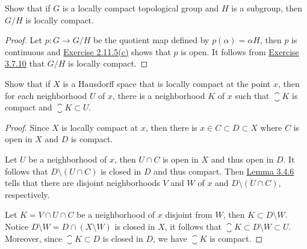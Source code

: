 \documentclass[12pt,a4paper]{article}
\begin{document}
    \begin{ex}
        Show that if $G$ is a locally compact topological group and $H$ is a subgroup, then $G/H$ is locally compact.
    \end{ex}
    \begin{proof}
        Let $p:G\to G/H$ be the quotient map defined by $p(\alpha)=\alpha H$, then $p$ is continuous and \hyperref[2.11.5]{Exercise 2.11.5(c)} shows that $p$ is open. It follows from \hyperref[3.7.10]{Exercise 3.7.10} that $G/H$ is locally compact.
    \end{proof}
    \hfill

    \begin{ex}
        Show that if $X$ is a Hausdorff space that is locally compact at the point $x$, then for each neighborhood $U$ of $x$, there is a neighborhood $K$ of $x$ such that $\closure{K}$ is compact and $\closure{K}\subset U$.
    \end{ex}
    \begin{proof}
        Since $X$ is locally compact at $x$, then there is $x\in C\subset D\subset X$ where $C$ is open in $X$ and $D$ is compact.
        
        Let $U$ be a neighborhood of $x$, then $U\cap C$ is open in $X$ and thus open in $D$. It follows that $D\setminus(U\cap C)$ is closed in $D$ and thus compact. Then \hyperref[3.4.6]{Lemma 3.4.6} tells that there are disjoint neighborhoods $V$ and $W$ of $x$ and $D\setminus(U\cap C)$, respectively. 

        Let $K=V\cap U\cap C$ be a neighborhood of $x$ disjoint from $W$, then $K\subset D\setminus W$. Notice $D\setminus W=D\cap(X\setminus W)$ is closed in $X$, it follows that $\closure{K}\subset D\setminus W\subset U$. Moreover, since $\closure{K}\subset D$ is closed in $D$, we have $\closure{K}$ is compact.
    \end{proof}
    \hfill
\end{document}
